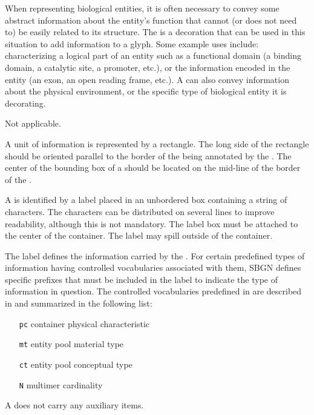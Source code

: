 When representing biological entities, it is often necessary to convey some abstract information about the entity's function that cannot (or does not need to) be easily related to its structure.  The  is a decoration that can be used in this situation to add information to a glyph.  Some example uses include: characterizing a logical part of an entity such as a functional domain (a binding domain, a catalytic site, a promoter, etc.), or the information encoded in the entity (an exon, an open reading frame, etc.).  A  can also convey information about the physical environment, or the specific type of biological entity it is decorating.

\begin{glyphDescription}

\glyphSboTerm Not applicable.

\glyphContainer A unit of information is represented by a rectangle.  The long side of the rectangle should be oriented parallel to the border of the  being annotated by the . The center of the bounding box of a  should be located on the mid-line of the border of the .

\glyphLabel A  is identified by a label placed in an unbordered box containing a string of characters.  The characters can be distributed on several lines to improve readability, although this is not mandatory.  The label box must be attached to the center of the container.  The label may spill outside of the container.

The label defines the information carried by the .  For certain predefined types of information having controlled vocabularies associated with them, SBGN defines specific prefixes that must be included in the label to indicate the type of information in question.  The controlled vocabularies predefined in \SBGNPDLone are described in  and summarized in the following list:

\begin{center}
  \begin{itemize}\setlength{\parskip}{0ex}
  \item[\texttt{pc}] container physical characteristic
  \item[\texttt{mt}] entity pool material type
  \item[\texttt{ct}] entity pool conceptual type
  \item[\texttt{N}]  multimer cardinality
  \end{itemize}
\end{center}

\glyphAux A  does not carry any auxiliary items.  

\end{glyphDescription}

